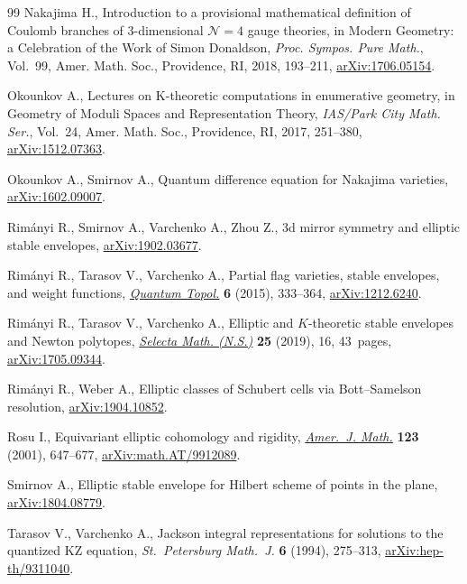 \documentclass[pdftex]{sigma}
\numberwithin{equation}{section}
\begin{document}
\begin{thebibliography}{99}
Nakajima H., Introduction to a provisional mathematical definition of {C}oulomb
 branches of 3-dimensional {${\mathcal N}=4$} gauge theories, in Modern
 Geometry: a Celebration of the Work of {S}imon {D}onaldson, \textit{Proc.
 Sympos. Pure Math.}, Vol.~99, Amer. Math. Soc., Providence, RI, 2018,
 193--211, \href{https://arxiv.org/abs/1706.05154}{arXiv:1706.05154}.

Okounkov A., Lectures on {K}-theoretic computations in enumerative geometry, in
 Geometry of Moduli Spaces and Representation Theory, \textit{IAS/Park City
 Math. Ser.}, Vol.~24, Amer. Math. Soc., Providence, RI, 2017, 251--380,
 \href{https://arxiv.org/abs/1512.07363}{arXiv:1512.07363}.

Okounkov A., Smirnov A., Quantum difference equation for Nakajima varieties,
 \href{https://arxiv.org/abs/1602.09007}{arXiv:1602.09007}.

Rim\'anyi R., Smirnov A., Varchenko A., Zhou Z., 3d mirror symmetry and
 elliptic stable envelopes, \href{https://arxiv.org/abs/1902.03677}{arXiv:1902.03677}.

Rim\'anyi R., Tarasov V., Varchenko A., Partial flag varieties, stable
 envelopes, and weight functions, \href{https://doi.org/10.4171/QT/65}{\textit{Quantum Topol.}} \textbf{6} (2015),
 333--364, \href{https://arxiv.org/abs/1212.6240}{arXiv:1212.6240}.

Rim\'anyi R., Tarasov V., Varchenko A., Elliptic and {$K$}-theoretic stable
 envelopes and {N}ewton polytopes, \href{https://doi.org/10.1007/s00029-019-0451-5}{\textit{Selecta Math. (N.S.)}} \textbf{25}
 (2019), 16, 43~pages, \href{https://arxiv.org/abs/1705.09344}{arXiv:1705.09344}.

Rim\'anyi R., Weber A., Elliptic classes of {S}chubert cells via
 {B}ott--{S}amelson resolution, \href{https://arxiv.org/abs/1904.10852}{arXiv:1904.10852}.

Rosu I., Equivariant elliptic cohomology and rigidity, \href{https://doi.org/10.1353/ajm.2001.0027}{\textit{Amer.~J. Math.}}
 \textbf{123} (2001), 647--677, \href{https://arxiv.org/abs/math.AT/9912089}{arXiv:math.AT/9912089}.

Smirnov A., Elliptic stable envelope for Hilbert scheme of points in the plane,
 \href{https://arxiv.org/abs/1804.08779}{arXiv:1804.08779}.

Tarasov V., Varchenko A., Jackson integral representations for solutions to the
 quantized KZ equation, \textit{St.~Petersburg Math.~J.} \textbf{6} (1994),
 275--313, \href{https://arxiv.org/abs/hep-th/9311040}{arXiv:hep-th/9311040}.


\end{thebibliography}
\end{document}

